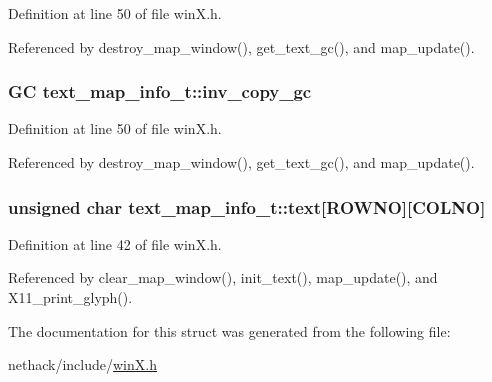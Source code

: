 Definition at line 50 of file win\+X.\+h.



Referenced by destroy\+\_\+map\+\_\+window(), get\+\_\+text\+\_\+gc(), and map\+\_\+update().

\hypertarget{structtext__map__info__t_a4b413e5d7506a16b271d791babf99444}{
\subsubsection[{inv\+\_\+copy\+\_\+gc}]{\setlength{\rightskip}{0pt plus 5cm}G\+C text\+\_\+map\+\_\+info\+\_\+t\+::inv\+\_\+copy\+\_\+gc}}\label{structtext__map__info__t_a4b413e5d7506a16b271d791babf99444}


Definition at line 50 of file win\+X.\+h.



Referenced by destroy\+\_\+map\+\_\+window(), get\+\_\+text\+\_\+gc(), and map\+\_\+update().

\hypertarget{structtext__map__info__t_ad278ca28ea443157e23f8030dc673a5d}{
\subsubsection[{text}]{\setlength{\rightskip}{0pt plus 5cm}unsigned char text\+\_\+map\+\_\+info\+\_\+t\+::text\mbox{[}{\bf R\+O\+W\+N\+O}\mbox{]}\mbox{[}{\bf C\+O\+L\+N\+O}\mbox{]}}}\label{structtext__map__info__t_ad278ca28ea443157e23f8030dc673a5d}


Definition at line 42 of file win\+X.\+h.



Referenced by clear\+\_\+map\+\_\+window(), init\+\_\+text(), map\+\_\+update(), and X11\+\_\+print\+\_\+glyph().



The documentation for this struct was generated from the following file\+:\begin{DoxyCompactItemize}
\item 
nethack/include/\hyperlink{winX_8h}{win\+X.\+h}\end{DoxyCompactItemize}
